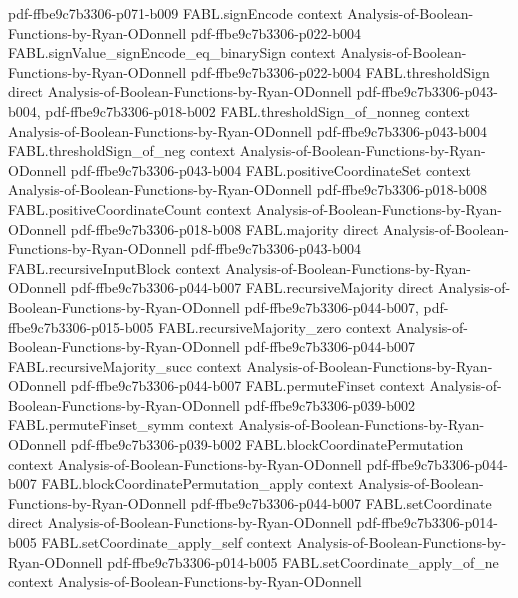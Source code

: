 \begin{theorem}
  {pdf-ffbe9c7b3306-p071-b009}
\proofstep
  {FABL.signEncode}
  {context}
  {Analysis-of-Boolean-Functions-by-Ryan-ODonnell}
  {pdf-ffbe9c7b3306-p022-b004}
\proofstep
  {FABL.signValue_signEncode_eq_binarySign}
  {context}
  {Analysis-of-Boolean-Functions-by-Ryan-ODonnell}
  {pdf-ffbe9c7b3306-p022-b004}
\proofstep
  {FABL.thresholdSign}
  {direct}
  {Analysis-of-Boolean-Functions-by-Ryan-ODonnell}
  {pdf-ffbe9c7b3306-p043-b004,
    pdf-ffbe9c7b3306-p018-b002}
\proofstep
  {FABL.thresholdSign_of_nonneg}
  {context}
  {Analysis-of-Boolean-Functions-by-Ryan-ODonnell}
  {pdf-ffbe9c7b3306-p043-b004}
\proofstep
  {FABL.thresholdSign_of_neg}
  {context}
  {Analysis-of-Boolean-Functions-by-Ryan-ODonnell}
  {pdf-ffbe9c7b3306-p043-b004}
\proofstep
  {FABL.positiveCoordinateSet}
  {context}
  {Analysis-of-Boolean-Functions-by-Ryan-ODonnell}
  {pdf-ffbe9c7b3306-p018-b008}
\proofstep
  {FABL.positiveCoordinateCount}
  {context}
  {Analysis-of-Boolean-Functions-by-Ryan-ODonnell}
  {pdf-ffbe9c7b3306-p018-b008}
\proofstep
  {FABL.majority}
  {direct}
  {Analysis-of-Boolean-Functions-by-Ryan-ODonnell}
  {pdf-ffbe9c7b3306-p043-b004}
\proofstep
  {FABL.recursiveInputBlock}
  {context}
  {Analysis-of-Boolean-Functions-by-Ryan-ODonnell}
  {pdf-ffbe9c7b3306-p044-b007}
\proofstep
  {FABL.recursiveMajority}
  {direct}
  {Analysis-of-Boolean-Functions-by-Ryan-ODonnell}
  {pdf-ffbe9c7b3306-p044-b007,
    pdf-ffbe9c7b3306-p015-b005}
\proofstep
  {FABL.recursiveMajority_zero}
  {context}
  {Analysis-of-Boolean-Functions-by-Ryan-ODonnell}
  {pdf-ffbe9c7b3306-p044-b007}
\proofstep
  {FABL.recursiveMajority_succ}
  {context}
  {Analysis-of-Boolean-Functions-by-Ryan-ODonnell}
  {pdf-ffbe9c7b3306-p044-b007}
\proofstep
  {FABL.permuteFinset}
  {context}
  {Analysis-of-Boolean-Functions-by-Ryan-ODonnell}
  {pdf-ffbe9c7b3306-p039-b002}
\proofstep
  {FABL.permuteFinset_symm}
  {context}
  {Analysis-of-Boolean-Functions-by-Ryan-ODonnell}
  {pdf-ffbe9c7b3306-p039-b002}
\proofstep
  {FABL.blockCoordinatePermutation}
  {context}
  {Analysis-of-Boolean-Functions-by-Ryan-ODonnell}
  {pdf-ffbe9c7b3306-p044-b007}
\proofstep
  {FABL.blockCoordinatePermutation_apply}
  {context}
  {Analysis-of-Boolean-Functions-by-Ryan-ODonnell}
  {pdf-ffbe9c7b3306-p044-b007}
\proofstep
  {FABL.setCoordinate}
  {direct}
  {Analysis-of-Boolean-Functions-by-Ryan-ODonnell}
  {pdf-ffbe9c7b3306-p014-b005}
\proofstep
  {FABL.setCoordinate_apply_self}
  {context}
  {Analysis-of-Boolean-Functions-by-Ryan-ODonnell}
  {pdf-ffbe9c7b3306-p014-b005}
\proofstep
  {FABL.setCoordinate_apply_of_ne}
  {context}
  {Analysis-of-Boolean-Functions-by-Ryan-ODonnell}

\end{theorem}
